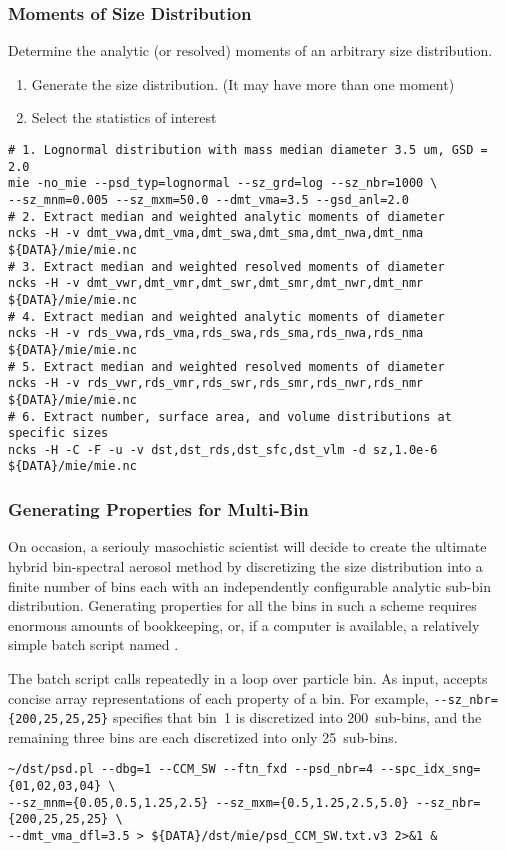 \documentclass[12pt,twoside]{article}
\begin{document}
\subsubsection[Moments of Size Distribution]{Moments of Size Distribution}\label{sxn:mie_mmn}
Determine the analytic (or resolved) moments of an arbitrary size
distribution.
\begin{enumerate}
\item Generate the size distribution. (It may have more than one moment)
\item Select the statistics of interest
\end{enumerate}
\begin{verbatim}
# 1. Lognormal distribution with mass median diameter 3.5 um, GSD = 2.0
mie -no_mie --psd_typ=lognormal --sz_grd=log --sz_nbr=1000 \
--sz_mnm=0.005 --sz_mxm=50.0 --dmt_vma=3.5 --gsd_anl=2.0
# 2. Extract median and weighted analytic moments of diameter
ncks -H -v dmt_vwa,dmt_vma,dmt_swa,dmt_sma,dmt_nwa,dmt_nma ${DATA}/mie/mie.nc
# 3. Extract median and weighted resolved moments of diameter
ncks -H -v dmt_vwr,dmt_vmr,dmt_swr,dmt_smr,dmt_nwr,dmt_nmr ${DATA}/mie/mie.nc
# 4. Extract median and weighted analytic moments of diameter
ncks -H -v rds_vwa,rds_vma,rds_swa,rds_sma,rds_nwa,rds_nma ${DATA}/mie/mie.nc
# 5. Extract median and weighted resolved moments of diameter
ncks -H -v rds_vwr,rds_vmr,rds_swr,rds_smr,rds_nwr,rds_nmr ${DATA}/mie/mie.nc
# 6. Extract number, surface area, and volume distributions at specific sizes
ncks -H -C -F -u -v dst,dst_rds,dst_sfc,dst_vlm -d sz,1.0e-6 ${DATA}/mie/mie.nc
\end{verbatim}

\subsubsection[Generating Properties for Multi-Bin Distributions]{Generating Properties for Multi-Bin}\label{sxn:mie_bin}
On occasion, a seriouly masochistic scientist will decide to create
the ultimate hybrid bin-spectral aerosol method by discretizing the
size distribution into a finite number of bins each with an
independently configurable analytic sub-bin distribution.
Generating properties for all the bins in such a scheme requires
enormous amounts of bookkeeping, or, if a computer is available,
a relatively simple \trmidx{Perl} batch script named . 

The  batch script calls  repeatedly in a
loop over particle bin.
As input,  accepts concise array representations of
each property of a bin.
For example, \verb'--sz_nbr={200,25,25,25}' specifies that bin~1 is
discretized into 200~sub-bins, and the remaining three bins are each
discretized into only 25~sub-bins.
\begin{verbatim}
~/dst/psd.pl --dbg=1 --CCM_SW --ftn_fxd --psd_nbr=4 --spc_idx_sng={01,02,03,04} \
--sz_mnm={0.05,0.5,1.25,2.5} --sz_mxm={0.5,1.25,2.5,5.0} --sz_nbr={200,25,25,25} \
--dmt_vma_dfl=3.5 > ${DATA}/dst/mie/psd_CCM_SW.txt.v3 2>&1 &
\end{verbatim}
\end{document}
